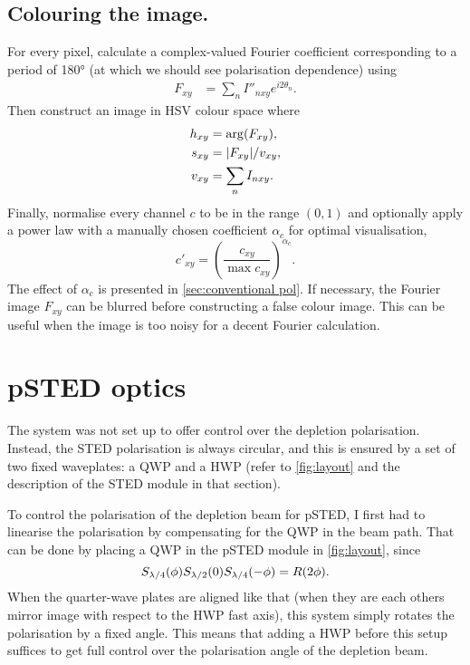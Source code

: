 \subsection{Colouring the image.} For every pixel, calculate a complex-valued Fourier coefficient corresponding to a period of \ang{180} (at which we should see polarisation dependence) using
\begin{align}
	F_{xy} &= \sum_n I''_{nxy} e^{i2\theta_n}.
\end{align}
Then construct an image in HSV colour space where 
\begin{align}
	h_{xy} &= \arg (F_{xy}),\\
	s_{xy} &= \abs{F_{xy}}/v_{xy},\\
	v_{xy} &= \sum_n I_{nxy}.
\end{align}
Finally, normalise every channel $ c $ to be in the range $ (0,1) $ and optionally apply a power law with a manually chosen coefficient $ \alpha_c $ for optimal visualisation,
\begin{equation}
	c'_{xy} = \left( \frac{c_{xy}}{\max c_{xy}} \right)^{\alpha_c}.
\end{equation}
The effect of $ \alpha_c $ is presented in \autoref{sec:conventional pol}. If necessary, the Fourier image $ F_{xy} $ can be blurred before constructing a false colour image. This can be useful when the image is too noisy for a decent Fourier calculation.

\section{pSTED optics}

\label{sec:psted implementation}

The system was not set up to offer control over the depletion polarisation. Instead, the STED polarisation is always circular, and this is ensured by a set of two fixed waveplates: a QWP and a HWP (refer to \autoref{fig:layout} and the description of the STED module in that section). 

To control the polarisation of the depletion beam for pSTED, I first had to linearise the polarisation by compensating for the QWP in the beam path. That can be done by placing a QWP in the pSTED module in \autoref{fig:layout}, since
\begin{equation}
	S_{\lambda/4}(\phi)S_{\lambda/2}(0)S_{\lambda/4}(-\phi) = R(2\phi).
\end{equation}
When the quarter-wave plates are aligned like that (when they are each others mirror image with respect to the HWP fast axis), this system simply rotates the polarisation by a fixed angle. This means that adding a HWP before this setup suffices to get full control over the polarisation angle of the depletion beam.

